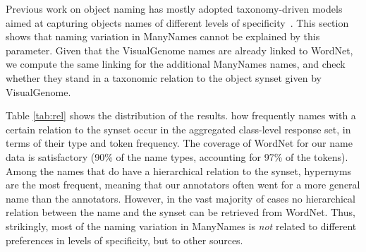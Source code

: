 Previous work on object naming has mostly adopted taxonomy-driven models aimed at capturing objects names of different levels of specificity~\cite{+++}.
This section shows that naming variation in ManyNames cannot be explained by this parameter.
Given that the VisualGenome names are already linked to WordNet, we compute the same linking for the additional ManyNames names, and check whether they stand in a taxonomic relation to the object synset given by VisualGenome.
%

Table \ref{tab:rel} shows the distribution of the results. 
how frequently names with a certain relation to the synset occur in the aggregated class-level response set, in terms of their  type and token frequency. 
The coverage of WordNet for our name data is satisfactory (90\% of the name types, accounting for 97\% of the tokens).
Among the names that do have a hierarchical relation to the synset, hypernyms are the most frequent, meaning that our annotators often went for a more general name than the \vgenome annotators.
However, in the vast majority of cases no hierarchical relation between the name and the synset can be retrieved from WordNet.
Thus, strikingly, most of the naming variation in ManyNames is \textit{not} related to different preferences in levels of specificity, but to other sources.

